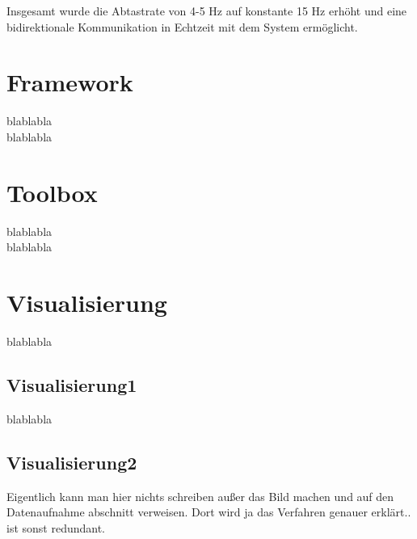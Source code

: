 Insgesamt wurde die Abtastrate von 4-5 Hz auf konstante 15 Hz erhöht und eine bidirektionale Kommunikation in Echtzeit mit dem System ermöglicht.


\section{Framework} %
\label{sub:Framework}
blablabla\\

blablabla


\section{Toolbox} %
\label{sub:Toolbox}
blablabla\\

blablabla


\section{Visualisierung} %
\label{sec:Visualisierung}
blablabla

\subsection{Visualisierung1} %
\label{sub:Visualisierung1}
blablabla


\subsection{Visualisierung2} %
\label{sub:Visualisierung2}
Eigentlich kann man hier nichts schreiben außer das Bild machen und auf den Datenaufnahme abschnitt verweisen. Dort wird ja das Verfahren genauer erklärt.. ist sonst redundant.


